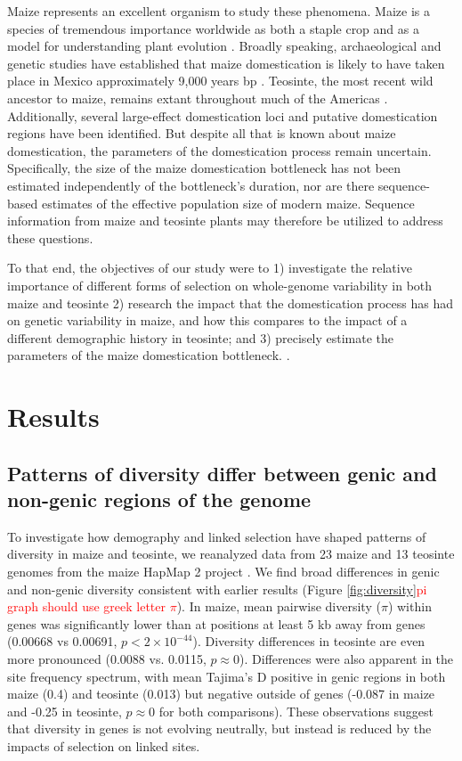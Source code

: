 \documentclass{pnastwo}
\newcommand{\jri}[1]{\textcolor{red}{\scriptsize #1}}
\begin{document}
\begin{article}
Maize represents an excellent organism to study these
phenomena. Maize is a species of tremendous importance worldwide as 
both a staple crop \cite{shiferaw2011} and as a model for
understanding plant evolution \cite{strable2009}. Broadly speaking, archaeological and genetic studies have
established that maize domestication is likely to have taken place in
 Mexico approximately 9,000 years bp
\cite{smith1995,matsuoka2002}. Teosinte, the most
recent wild ancestor to maize, remains extant throughout much of the
Americas \cite{wilkes1967}. Additionally, several large-effect
domestication loci \cite{doebley1995, wills2013, wang2015} and putative domestication
regions \cite{hufford2012} have been identified. But despite all that is
known about maize domestication, the parameters of the
domestication process remain uncertain. Specifically, the size of the
maize domestication bottleneck has not been estimated independently of
the bottleneck's duration, nor are there sequence-based estimates of the effective
population size of modern maize. Sequence information from maize and
teosinte plants may therefore be utilized to address these questions.

To that end, the objectives of our study were to 1) investigate the
relative importance of different forms of selection on whole-genome
variability in both maize and teosinte 2) research the impact that the
domestication process has had on genetic variability in maize, and how
this compares to the impact of a different demographic history in
teosinte; and 3) precisely estimate the parameters of the
maize domestication bottleneck.  \cite{chia2012}.

\section{Results}
\subsection{Patterns of diversity differ between genic and  non-genic regions of the genome}
To investigate how demography and linked selection have shaped patterns of diversity in maize and teosinte, we reanalyzed data from 23 maize and 13 teosinte genomes from the maize HapMap 2 project \cite{chia2012}.
We find broad differences in genic and non-genic diversity consistent with earlier results  \cite{hufford2012} (Figure \ref{fig:diversity}\jri{pi graph should use greek letter $\pi$}).  
In maize, mean pairwise diversity ($\pi$) within genes was significantly lower than at positions at least 5 kb away from genes (0.00668 vs 0.00691, $p<2\times 10^{-44}$). 
Diversity differences in teosinte are even more pronounced (0.0088 vs. 0.0115, $p\approx 0$). 
Differences were also apparent in the site frequency spectrum, with mean Tajima's D positive in genic regions in both maize (0.4) and teosinte (0.013) but negative outside of genes (-0.087 in maize and -0.25 in teosinte, $p\approx 0$ for both comparisons).
These observations suggest that diversity in genes is not evolving neutrally, but instead is reduced by the impacts of selection on linked sites. 



\end{article}
\end{document}
